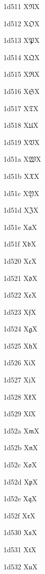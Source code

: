 \documentclass[11pt]{article}
\begin{document}
1d511 X{\ensuremath{\mathfrak{N}}}X

1d512 X{\ensuremath{\mathfrak{O}}}X

1d513 X{\ensuremath{\mathfrak{P}}}X

1d514 X{\ensuremath{\mathfrak{Q}}}X

1d515 X{\ensuremath{\mathfrak{R}}}X

1d516 X{\ensuremath{\mathfrak{S}}}X

1d517 X{\ensuremath{\mathfrak{T}}}X

1d518 X{\ensuremath{\mathfrak{U}}}X

1d519 X{\ensuremath{\mathfrak{V}}}X

1d51a X{\ensuremath{\mathfrak{W}}}X

1d51b X{\ensuremath{\mathfrak{X}}}X

1d51c X{\ensuremath{\mathfrak{Y}}}X

1d51d X{\ensuremath{\mathfrak{Z}}}X

1d51e X{\ensuremath{\mathfrak{a}}}X

1d51f X{\ensuremath{\mathfrak{b}}}X

1d520 X{\ensuremath{\mathfrak{c}}}X

1d521 X{\ensuremath{\mathfrak{d}}}X

1d522 X{\ensuremath{\mathfrak{e}}}X

1d523 X{\ensuremath{\mathfrak{f}}}X

1d524 X{\ensuremath{\mathfrak{g}}}X

1d525 X{\ensuremath{\mathfrak{h}}}X

1d526 X{\ensuremath{\mathfrak{i}}}X

1d527 X{\ensuremath{\mathfrak{j}}}X

1d528 X{\ensuremath{\mathfrak{k}}}X

1d529 X{\ensuremath{\mathfrak{l}}}X

1d52a X{\ensuremath{\mathfrak{m}}}X

1d52b X{\ensuremath{\mathfrak{n}}}X

1d52c X{\ensuremath{\mathfrak{o}}}X

1d52d X{\ensuremath{\mathfrak{p}}}X

1d52e X{\ensuremath{\mathfrak{q}}}X

1d52f X{\ensuremath{\mathfrak{r}}}X

1d530 X{\ensuremath{\mathfrak{s}}}X

1d531 X{\ensuremath{\mathfrak{t}}}X

1d532 X{\ensuremath{\mathfrak{u}}}X
\end{document}
